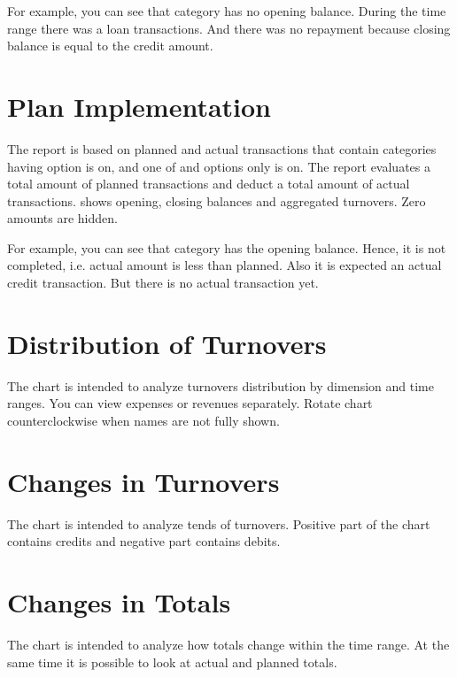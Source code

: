 \documentclass[a4paper,10pt,english]{sphinxmanual}
\begin{document}
For example, you can see that  category has no opening balance.
During the time range there was a loan transactions. And there was no repayment because
closing balance is equal to the credit amount.


\section{Plan Implementation}
\label{\detokenize{reports:plan-implementation}}
The report is based on planned and actual transactions that contain categories having
 option is on, and one of 
and  options only is on. The report evaluates a total
amount of planned transactions and deduct a total amount of actual transactions.
 shows opening,
closing balances and aggregated turnovers. Zero amounts are hidden.

For example, you can see that  category has the opening balance.
Hence, it is not completed, i.e. actual amount is less than planned.
Also it is expected an actual credit transaction. But there is no
actual transaction yet.

\noindent{}

\noindent{}

\noindent{}


\section{Distribution of Turnovers}
\label{\detokenize{reports:distribution-of-turnovers}}
The chart is intended to analyze turnovers distribution by dimension and time ranges. You can view
expenses or revenues separately. Rotate chart counterclockwise when names are not fully shown.


\section{Changes in Turnovers}
\label{\detokenize{reports:changes-in-turnovers}}
The chart is intended to analyze tends of turnovers. Positive part of the chart contains
credits and negative part contains debits.


\section{Changes in Totals}
\label{\detokenize{reports:changes-in-totals}}
The chart is intended to analyze how totals change within the time range. At the same time
it is possible to look at actual and planned totals.
\end{document}
